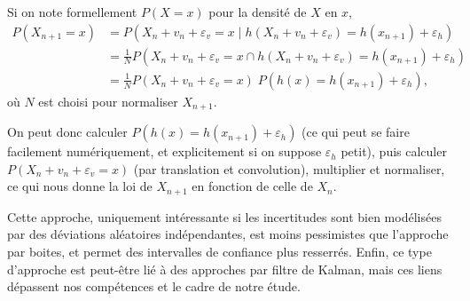   Si on note formellement $P(X=x)$ pour la densité de $X$ en $x$,
  \begin{align*}
    P(X_{n+1} = x) &= P(X_{n} + v_{n} + \varepsilon_{v} = x \;\Big|\;
    h(X_{n} + v_{n} + \varepsilon_{v}) = h(x_{n+1}) + 
                     \varepsilon_{h})\\
    &= \frac 1 N P(X_{n} + v_{n} + \varepsilon_{v} = x \cap
    h(X_{n} + v_{n} + \varepsilon_{v}) = h(x_{n+1}) + \varepsilon_{h})\\
    &= \frac 1 N P(X_{n} + v_{n} + \varepsilon_{v} = x) \; P(h(x) = h(x_{n+1}) + \varepsilon_{h}),
  \end{align*}
  où $N$ est choisi pour normaliser $X_{n+1}$.

  On peut donc calculer $P(h(x) = h(x_{n+1}) + \varepsilon_{h})$ (ce
  qui peut se faire facilement numériquement, et explicitement si on
  suppose $\varepsilon_{h}$ petit), puis calculer
  $P(X_{n} + v_{n} + \varepsilon_{v} = x)$ (par translation et
  convolution), multiplier et normaliser, ce qui nous donne la loi de
  $X_{n+1}$ en fonction de celle de $X_{n}$.

  Cette approche, uniquement intéressante si les incertitudes sont
  bien modélisées par des déviations aléatoires indépendantes, est
  moins pessimistes que l'approche par boites, et permet des
  intervalles de confiance plus resserrés. Enfin, ce type d'approche
  est peut-être lié à des approches par filtre de Kalman, mais ces
  liens dépassent nos compétences et le cadre de notre étude.
